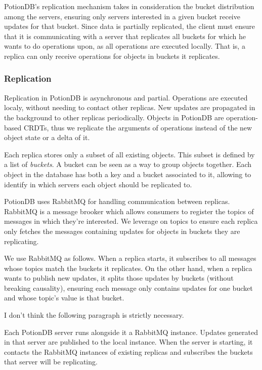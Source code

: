 \documentclass{vldb}
\newcommand{\grumbler}[2]{{\color{red}{\bf #1:} #2}}
\newcommand{\andre}[1]{\grumbler{andre}{#1}}
\begin{document}
PotionDB's replication mechanism takes in consideration the bucket distribution among the servers, ensuring only servers interested in a given bucket receive updates for that bucket.
Since data is partially replicated, the client must ensure that it is communicating with a server that replicates all buckets for which he wants to do operations upon, as all operations are executed locally.
That is, a replica can only receive operations for objects in buckets it replicates.

\subsubsection{Replication}
\label{subsubsec:replication}

Replication in PotionDB is asynchronous and partial.
Operations are executed localy, without needing to contact other replicas.
New updates are propagated in the background to other replicas periodically.
Objects in PotionDB are operation-based CRDTs, thus we replicate the arguments of operations instead of the new object state or a delta of it.

Each replica stores only a subset of all existing objects.
This subset is defined by a list of \emph{buckets}.
A bucket can be seen as a way to group objects together.
Each object in the database has both a key and a bucket associated to it, allowing to identify in which servers each object should be replicated to.

PotionDB uses RabbitMQ \cite{???} for handling communication between replicas.
RabbitMQ is a message brooker which allows consumers to register the topics of messages in which they're interested.
We leverage on topics to ensure each replica only fetches the messages containing updates for objects in buckets they are replicating.

We use RabbitMQ as follows.
When a replica starts, it subscribes to all messages whose topics match the buckets it replicates.
On the other hand, when a replica wants to publish new updates, it splits those updates by buckets (without breaking causality), ensuring each message only contains updates for one bucket and whose topic's value is that bucket.

\andre{I don't think the following paragraph is strictly necessary.}

Each PotionDB server runs alongside it a RabbitMQ instance.
Updates generated in that server are published to the local instance.
When the server is starting, it contacts the RabbitMQ instances of existing replicas and subscribes the buckets that server will be replicating.
\end{document}
